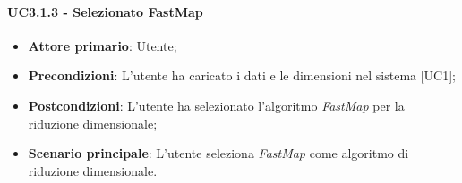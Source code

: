 \paragraph{UC3.1.3 - Selezionato FastMap}
\begin{itemize}
	\item \textbf{Attore primario}: Utente;
	\item \textbf{Precondizioni}: L'utente ha caricato i dati e le dimensioni nel sistema [UC1];
	\item \textbf{Postcondizioni}: L'utente ha selezionato l'algoritmo \textit{FastMap} per la riduzione dimensionale;
	\item \textbf{Scenario principale}: L'utente seleziona \textit{FastMap} come algoritmo di riduzione dimensionale.
\end{itemize}